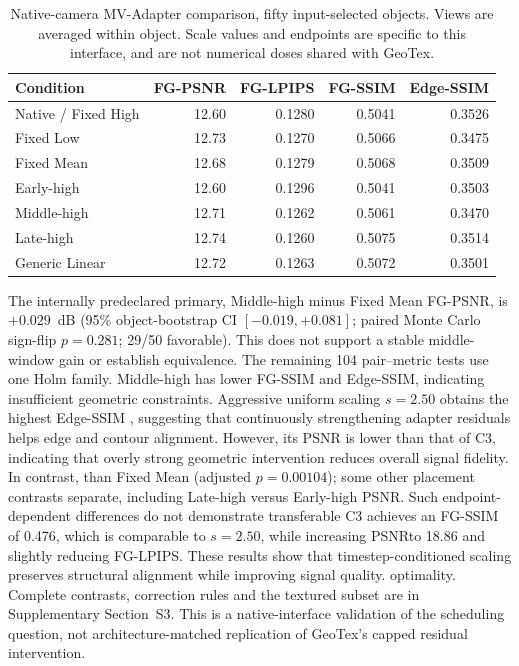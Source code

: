 \documentclass[times,twocolumn,final]{elsarticle}
\providecommand{\DIFadd}[1]{{\protect\color{blue} \sf #1}} %
\providecommand{\DIFdel}[1]{{\protect\color{red} \scriptsize #1}} %
\providecommand{\DIFaddbegin}{} %
\providecommand{\DIFaddend}{} %
\providecommand{\DIFdelbegin}{} %
\providecommand{\DIFdelend}{} %
\begin{document}
\begin{table}[ht]\centering\scriptsize
\caption{Native-camera MV-Adapter comparison, fifty input-selected objects. Views are averaged within object. Scale values and endpoints are specific to this interface, and are not numerical doses shared with GeoTex.}\label{tab:new-mva}
\begin{tabular}{lrrrr}
\toprule Condition & FG-PSNR & FG-LPIPS & FG-SSIM & Edge-SSIM \\
\midrule
Native / Fixed High & 12.60 & 0.1280 & 0.5041 & 0.3526 \\
Fixed Low & 12.73 & 0.1270 & 0.5066 & 0.3475 \\
Fixed Mean & 12.68 & 0.1279 & 0.5068 & 0.3509 \\
Early-high & 12.60 & 0.1296 & 0.5041 & 0.3503 \\
Middle-high & 12.71 & 0.1262 & 0.5061 & 0.3470 \\
Late-high & 12.74 & 0.1260 & 0.5075 & 0.3514 \\
Generic Linear & 12.72 & 0.1263 & 0.5072 & 0.3501 \\
\bottomrule\end{tabular}\end{table}

\DIFadd{The internally predeclared primary, Middle-high minus Fixed Mean FG-PSNR, is $+0.029$~dB (95\% object-bootstrap CI $[-0.019,+0.081]$; paired Monte Carlo sign-flip $p=0.281$; 29/50 favorable). This does not support a stable middle-window gain or establish equivalence. The remaining 104 pair--metric tests use one Holm family. Middle-high }\DIFaddend has lower \DIFdelbegin \DIFdel{FG-SSIM and Edge-SSIM, indicating insufficient geometric constraints. Aggressive uniform scaling $s = 2.50$ obtains the highest }\DIFdelend Edge-SSIM \DIFdelbegin \DIFdel{, suggesting that continuously strengthening adapter residuals helps edge and contour alignment. However, its PSNR is lower than that of C3, indicating that overly strong geometric intervention reduces overall signal fidelity. In contrast, }\DIFdelend \DIFaddbegin \DIFadd{than Fixed Mean (adjusted $p=0.00104$); some other placement contrasts separate, including Late-high versus Early-high PSNR. Such endpoint-dependent differences do not demonstrate transferable }\DIFaddend C3 \DIFdelbegin \DIFdel{achieves an FG-SSIM of 0.476, which is comparable to $s = 2.50$, while increasing PSNRto 18.86 and slightly reducing FG-LPIPS. These results show that timestep-conditioned scaling preserves structural alignment while improving signal quality.
}\DIFdelend \DIFaddbegin \DIFadd{optimality. Complete contrasts, correction rules and the textured subset are in Supplementary Section~S3. This is a native-interface validation of the scheduling question, not architecture-matched replication of GeoTex's capped residual intervention.
}\DIFaddend 
\end{document}
